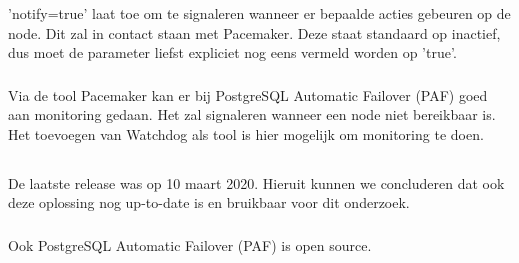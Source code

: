 'notify=true' laat toe om te signaleren wanneer er bepaalde acties gebeuren op de node. Dit zal in contact staan met Pacemaker. Deze staat standaard op inactief, dus moet de parameter liefst expliciet nog eens vermeld worden op 'true'.

\subsubsection{}
\label{subsubsec:Monitoring}

Via de tool Pacemaker kan er bij PostgreSQL Automatic Failover (PAF) goed aan monitoring gedaan. Het zal signaleren wanneer een node niet bereikbaar is.
Het toevoegen van Watchdog als tool is hier mogelijk om monitoring te doen.


\subsection{}
\label{subsec:Should have}




\subsubsection{}
\label{subsubsec:Actieve ondersteuning in 2020-2021}

De laatste release was op 10 maart 2020. Hieruit kunnen we concluderen dat ook deze oplossing nog up-to-date is en bruikbaar voor dit onderzoek. 

\subsubsection{}
\label{subsubsec:Open source}

Ook PostgreSQL Automatic Failover (PAF) is open source.

\subsection{}
\label{subsec:Could have}


\subsubsection{}
\label{subsubsec:Grafische interface}


